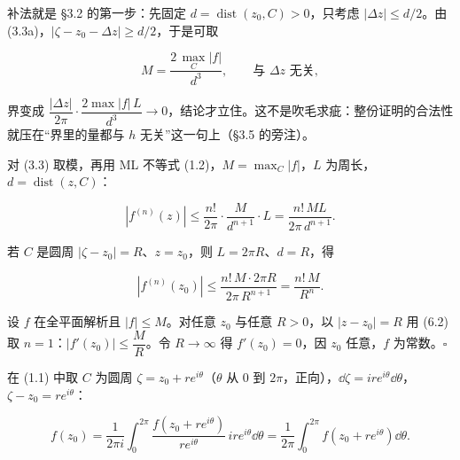 \documentclass[11pt]{ctexart}
\let\origsubhdr\subhdr
\renewcommand{\subhdr}[1]{\par\origsubhdr{#1}}
\begin{document}
补法就是 §3.2 的第一步：先固定 $d=\operatorname{dist}(z_0,C)>0$，只考虑 $|\Delta z|\le d/2$。由 (3.3a)，$|\zeta-z_0-\Delta z|\ge d/2$，于是可取

\begin{equation}
M=\frac{2\,\max_C|f|}{d^{3}},
\qquad\text{与 }\Delta z\text{ 无关},
\tag{5.4}
\end{equation}

界变成 $\dfrac{|\Delta z|}{2\pi}\cdot\dfrac{2\max|f|\,L}{d^{3}}\to0$，结论才立住。这不是吹毛求疵：整份证明的合法性就压在“界里的量都与 $h$ 无关”这一句上（§3.5 的旁注）。



对 (3.3) 取模，再用 ML 不等式 (1.2)，$M=\max_C|f|$，$L$ 为周长，$d=\operatorname{dist}(z,C)$：

\begin{equation}
|f^{(n)}(z)|\le\frac{n!}{2\pi}\cdot\frac{M}{d^{n+1}}\cdot L=\frac{n!\,ML}{2\pi\,d^{n+1}} .
\tag{6.1}
\end{equation}

若 $C$ 是圆周 $|\zeta-z_0|=R$、$z=z_0$，则 $L=2\pi R$、$d=R$，得

\begin{equation}
|f^{(n)}(z_0)|\le\frac{n!\,M\cdot2\pi R}{2\pi\,R^{n+1}}=\frac{n!\,M}{R^{n}} .
\tag{6.2}
\end{equation}



设 $f$ 在全平面解析且 $|f|\le M$。对任意 $z_0$ 与任意 $R>0$，以 $|z-z_0|=R$ 用 (6.2) 取 $n=1$：$|f'(z_0)|\le\dfrac{M}{R}$。令 $R\to\infty$ 得 $f'(z_0)=0$，因 $z_0$ 任意，$f$ 为常数。$\square$


在 (1.1) 中取 $C$ 为圆周 $\zeta=z_0+re^{i\theta}$（$\theta$ 从 $0$ 到 $2\pi$，正向），$\dd\zeta=ire^{i\theta}\dd\theta$，$\zeta-z_0=re^{i\theta}$：

\begin{equation}
f(z_0)=\frac{1}{2\pi i}\int_0^{2\pi}\frac{f(z_0+re^{i\theta})}{re^{i\theta}}\,ire^{i\theta}\dd\theta
=\frac{1}{2\pi}\int_0^{2\pi}f(z_0+re^{i\theta})\dd\theta .
\tag{6.3}
\end{equation}
\end{document}
